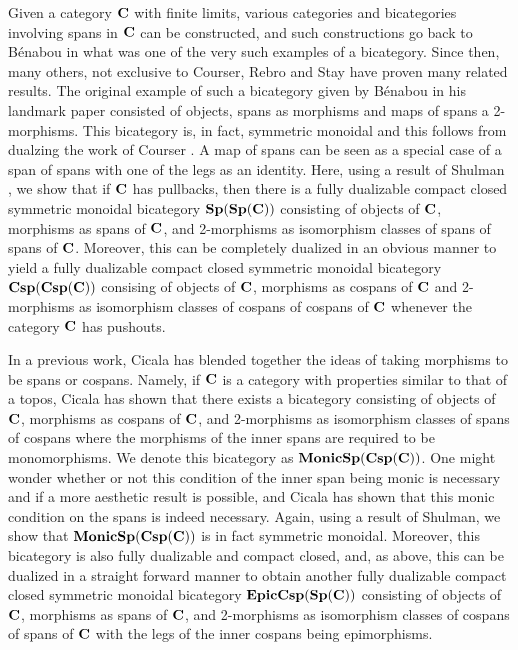 \documentclass[11pt]{amsart}
\theoremstyle{remark}
\theoremstyle{definition}
\begin{document}
{\color{red}
Given a category $\bold{C}$ with finite limits, various categories and bicategories involving spans in $\bold{C}$ can be constructed, and such constructions go back to B\'enabou \cite{Be} in what was one of the very such examples of a bicategory. Since then, many others, not exclusive to Courser, Rebro and Stay \cite{Cour,Reb,Stay} have proven many related results. The original example of such a bicategory given by B\'enabou \cite{Be} in his landmark paper consisted of objects, spans as morphisms and maps of spans a 2-morphisms. This bicategory is, in fact, symmetric monoidal and this follows from dualzing the work of Courser \cite{Cour}. A map of spans can be seen as a special case of a span of spans with one of the legs as an identity. Here, using a result of Shulman \cite{Shul}, we show that if $\bold{C}$ has pullbacks, then there is a fully dualizable compact closed symmetric monoidal bicategory $\bold{Sp(Sp(C))}$ consisting of objects of $\bold{C}$, morphisms as spans of $\bold{C}$, and 2-morphisms as isomorphism classes of spans of spans of $\bold{C}$. Moreover, this can be completely dualized in an obvious manner to yield a fully dualizable compact closed symmetric monoidal bicategory $\bold{Csp(Csp(C))}$ consising of objects of $\bold{C}$, morphisms as cospans of $\bold{C}$ and 2-morphisms as isomorphism classes of cospans of cospans of $\bold{C}$ whenever the category $\bold{C}$ has pushouts.

In a previous work, Cicala \cite{Cic} has blended together the ideas of taking morphisms to be spans or cospans. Namely, if $\bold{C}$ is a category with properties similar to that of a topos, Cicala has shown that there exists a bicategory consisting of objects of $\bold{C}$, morphisms as cospans of $\bold{C}$, and 2-morphisms as isomorphism classes of spans of cospans where the morphisms of the inner spans are required to be monomorphisms. We denote this bicategory as $\bold{MonicSp(Csp(C))}$. One might wonder whether or not this condition of the inner span being monic is necessary and if a more aesthetic result is possible, and Cicala has shown that this monic condition on the spans is indeed necessary. Again, using a result of Shulman, we show that $\bold{MonicSp(Csp(C))}$ is in fact symmetric monoidal. Moreover, this bicategory is also fully dualizable and compact closed, and, as above, this can be dualized in a straight forward manner to obtain another fully dualizable compact closed symmetric monoidal bicategory $\bold{EpicCsp(Sp(C))}$ consisting of objects of $\bold{C}$, morphisms as spans of $\bold{C}$, and 2-morphisms as isomorphism classes of cospans of spans of $\bold{C}$ with the legs of the inner cospans being epimorphisms.

}
\end{document}
